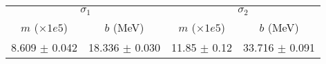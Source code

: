 \begin{tabular}{cc|cc}
\multicolumn{2}{c|}{$\sigma_1$} & \multicolumn{2}{|c}{$\sigma_2$} \\
$m$ ($\times1e5$) & $b$ (MeV) & $m$ ($\times1e5$) & $b$ (MeV) \\
\hline
8.609 $\pm$ 0.042 & 18.336 $\pm$ 0.030 & 11.85 $\pm$ 0.12 & 33.716 $\pm$ 0.091\\
\end{tabular}
